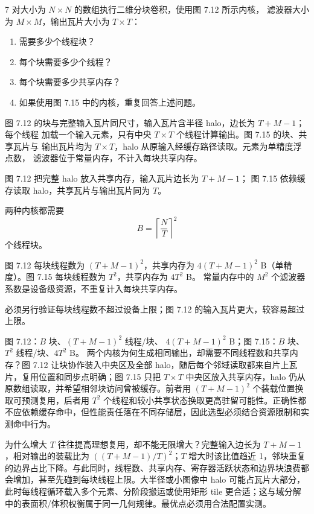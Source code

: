 \begin{solutionexercise}{7}
\problemheading 对大小为 $N\times N$ 的数组执行二维分块卷积，使用图 7.12 所示内核，
滤波器大小为 $M\times M$，输出瓦片大小为 $T\times T$：
\begin{enumerate}[label=\alph*.,leftmargin=2.2em]
  \item 需要多少个线程块？
  \item 每个块需要多少个线程？
  \item 每个块需要多少共享内存？
  \item 如果使用图 7.15 中的内核，重复回答上述问题。
\end{enumerate}
图 7.12 的块与完整输入瓦片同尺寸，输入瓦片含半径 halo，边长为 $T+M-1$；每个线程
加载一个输入元素，只有中央 $T\times T$ 个线程计算输出。图 7.15 的块、共享瓦片与
输出瓦片均为 $T\times T$，halo 从原输入经缓存路径读取。元素为单精度浮点数，
滤波器位于常量内存，不计入每块共享内存。

\approachheading 图 7.12 把完整 halo 放入共享内存，输入瓦片边长为 $T+M-1$；
图 7.15 依赖缓存读取 halo，共享瓦片与输出瓦片同为 $T$。

\answerheading 两种内核都需要
\[
B=\left\lceil\frac NT\right\rceil^2
\]
个线程块。

图 7.12 每块线程数为 $(T+M-1)^2$，共享内存为
$4(T+M-1)^2$ B（单精度）。图 7.15 每块线程数为 $T^2$，共享内存为 $4T^2$ B。
常量内存中的 $M^2$ 个滤波器系数是设备级资源，不重复计入每块共享内存。

必须另行验证每块线程数不超过设备上限；图 7.12 的输入瓦片更大，较容易超过上限。

\conclusionheading 图 7.12：$B$ 块、$(T+M-1)^2$ 线程/块、
$4(T+M-1)^2$ B；图 7.15：$B$ 块、$T^2$ 线程/块、$4T^2$ B。
\discussionheading
{}
两个内核为何生成相同输出，却需要不同线程数和共享内存？图 7.12 让块协作装入中央区及全部 halo，随后每个邻域读取都来自片上瓦片，复用位置和同步点明确；图 7.15 只把 $T\times T$ 中央区放入共享内存，halo 仍从原数组读取，并希望相邻块访问曾被缓存。前者用 $(T+M-1)^2$ 个装载位置换取可预测复用，后者用 $T^2$ 个线程和较小共享状态换取更高驻留可能性。正确性都不应依赖缓存命中，但性能责任落在不同存储层，因此选型必须结合资源限制和实测命中行为。

为什么增大 $T$ 往往提高理想复用，却不能无限增大？完整输入边长为 $T+M-1$，相对输出的装载比为 $((T+M-1)/T)^2$；$T$ 增大时该比值趋近 1，邻块重复的边界占比下降。与此同时，线程数、共享内存、寄存器活跃状态和边界块浪费都会增加，甚至先碰到每块线程上限。大半径或小图像中 halo 可能占瓦片大部分，此时每线程循环载入多个元素、分阶段搬运或使用矩形 tile 更合适；这与域分解中的表面积/体积权衡属于同一几何规律。最优点必须用合法配置实测。


\end{solutionexercise}
